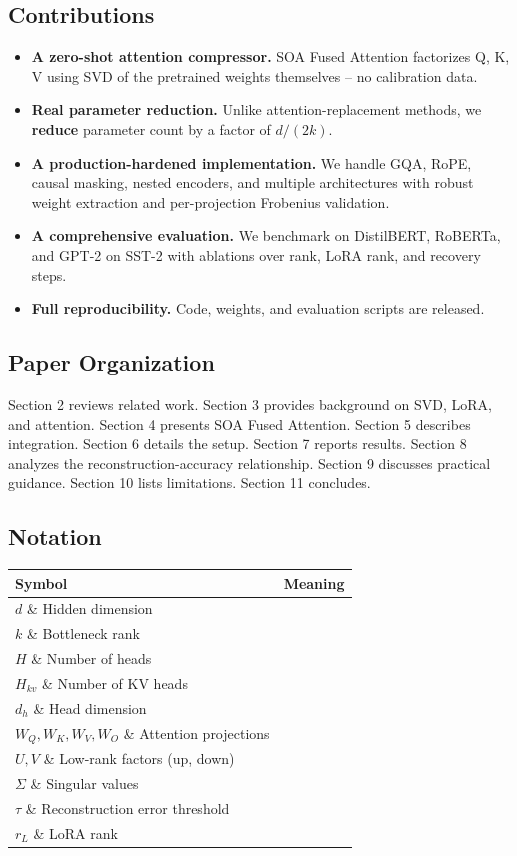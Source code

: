 \subsection{Contributions}

\begin{itemize}
\item \textbf{A zero-shot attention compressor.} SOA Fused Attention factorizes Q, K,
  V using SVD of the pretrained weights themselves -- no calibration data.
\item \textbf{Real parameter reduction.} Unlike attention-replacement methods, we
  \textbf{reduce} parameter count by a factor of $d / (2k)$.
\item \textbf{A production-hardened implementation.} We handle GQA, RoPE, causal
  masking, nested encoders, and multiple architectures with robust weight
  extraction and per-projection Frobenius validation.
\item \textbf{A comprehensive evaluation.} We benchmark on DistilBERT, RoBERTa, and
  GPT-2 on SST-2 with ablations over rank, LoRA rank, and recovery steps.
\item \textbf{Full reproducibility.} Code, weights, and evaluation scripts are released.

\end{itemize}
\subsection{Paper Organization}

Section 2 reviews related work. Section 3 provides background on SVD, LoRA, 
and attention. Section 4 presents SOA Fused Attention. Section 5 describes 
integration. Section 6 details the setup. Section 7 reports results. 
Section 8 analyzes the reconstruction-accuracy relationship. Section 9 
discusses practical guidance. Section 10 lists limitations. Section 11 
concludes.



\subsection{Notation}

\begin{table}[H]
\centering
\small
\begin{tabular}{ll}
\toprule
\textbf{Symbol} & \textbf{Meaning} \\
\midrule
$d$ \& Hidden dimension \\
$k$ \& Bottleneck rank \\
$H$ \& Number of heads \\
$H_{kv}$ \& Number of KV heads \\
$d_h$ \& Head dimension \\
$W_Q, W_K, W_V, W_O$ \& Attention projections \\
$U, V$ \& Low-rank factors (up, down) \\
$\Sigma$ \& Singular values \\
$\tau$ \& Reconstruction error threshold \\
$r_L$ \& LoRA rank \\
\bottomrule
\end{tabular}
\end{table}

